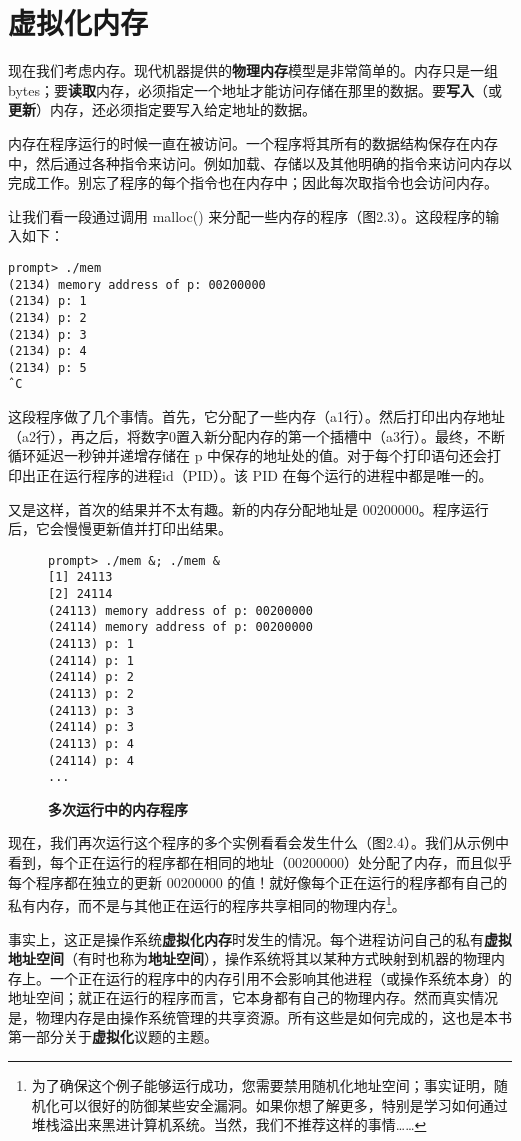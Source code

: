 \section{虚拟化内存}
现在我们考虑内存。现代机器提供的\textbf{物理内存}模型是非常简单的。内存只是一组 bytes；要\textbf{读取}内存，必须指定一个地址才能访问存储在那里的数据。要\textbf{写入}（或\textbf{更新}）内存，还必须指定要写入给定地址的数据。

内存在程序运行的时候一直在被访问。一个程序将其所有的数据结构保存在内存中，然后通过各种指令来访问。例如加载、存储以及其他明确的指令来访问内存以完成工作。别忘了程序的每个指令也在内存中；因此每次取指令也会访问内存。

让我们看一段通过调用 malloc() 来分配一些内存的程序（图2.3）。这段程序的输入如下：
\begin{verbatim}
prompt> ./mem
(2134) memory address of p: 00200000
(2134) p: 1
(2134) p: 2
(2134) p: 3
(2134) p: 4
(2134) p: 5
ˆC
\end{verbatim}

这段程序做了几个事情。首先，它分配了一些内存（a1行）。然后打印出内存地址（a2行），再之后，将数字0置入新分配内存的第一个插槽中（a3行）。最终，不断循环延迟一秒钟并递增存储在 p 中保存的地址处的值。对于每个打印语句还会打印出正在运行程序的进程id（PID）。该 PID 在每个运行的进程中都是唯一的。

又是这样，首次的结果并不太有趣。新的内存分配地址是 00200000。程序运行后，它会慢慢更新值并打印出结果。

\begin{figure}[ht]
\begin{verbatim}
prompt> ./mem &; ./mem &
[1] 24113
[2] 24114
(24113) memory address of p: 00200000
(24114) memory address of p: 00200000
(24113) p: 1
(24114) p: 1
(24114) p: 2
(24113) p: 2
(24113) p: 3
(24114) p: 3
(24113) p: 4
(24114) p: 4
... 
\end{verbatim}
\caption{\textbf{多次运行中的内存程序}}
\end{figure}

现在，我们再次运行这个程序的多个实例看看会发生什么（图2.4）。我们从示例中看到，每个正在运行的程序都在相同的地址（00200000）处分配了内存，而且似乎每个程序都在独立的更新 00200000 的值！就好像每个正在运行的程序都有自己的私有内存，而不是与其他正在运行的程序共享相同的物理内存\footnote{为了确保这个例子能够运行成功，您需要禁用随机化地址空间；事实证明，随机化可以很好的防御某些安全漏洞。如果你想了解更多，特别是学习如何通过堆栈溢出来黑进计算机系统。当然，我们不推荐这样的事情……}。

事实上，这正是操作系统\textbf{虚拟化内存}时发生的情况。每个进程访问自己的私有\textbf{虚拟地址空间}（有时也称为\textbf{地址空间}），操作系统将其以某种方式映射到机器的物理内存上。一个正在运行的程序中的内存引用不会影响其他进程（或操作系统本身）的地址空间；就正在运行的程序而言，它本身都有自己的物理内存。然而真实情况是，物理内存是由操作系统管理的共享资源。所有这些是如何完成的，这也是本书第一部分关于\textbf{虚拟化}议题的主题。

